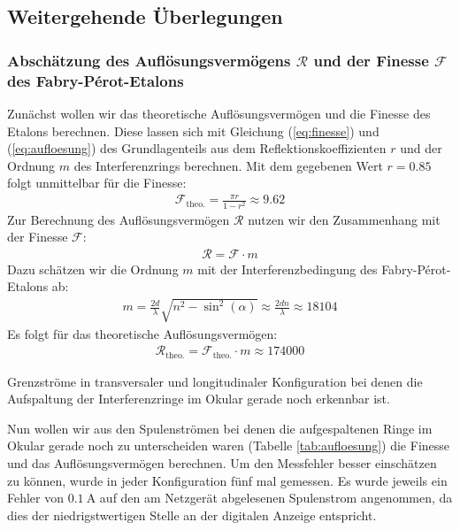 \documentclass[11pt, a4paper]{article}
\begin{document}
\subsection{Weitergehende Überlegungen}
\subsubsection{Abschätzung des Auflösungsvermögens $\mathcal{R}$ und der Finesse $\mathcal{F}$ des Fabry-Pérot-Etalons}
Zunächst wollen wir das theoretische Auflösungsvermögen und die Finesse des Etalons berechnen.
Diese lassen sich mit Gleichung (\ref{eq:finesse}) und (\ref{eq:aufloesung}) des Grundlagenteils aus dem Reflektionskoeffizienten $r$ und der Ordnung $m$ des Interferenzrings berechnen.
Mit dem gegebenen Wert $r = \num{0,85}$ folgt unmittelbar für die Finesse:
\begin{align*}
	\mathcal{F_\mathrm{theo.}} = \frac{\pi r}{1 - r^2} \approx \num{9.62}
\end{align*}
Zur Berechnung des Auflösungsvermögen $\mathcal{R}$ nutzen wir den Zusammenhang mit der Finesse $\mathcal{F}$:
\begin{align}
\mathcal{R} = \mathcal{F} \cdot m
\end{align}
Dazu schätzen wir die Ordnung $m$ mit der Interferenzbedingung des Fabry-Pérot-Etalons ab:
\begin{align*}
m = \frac{2 d}{\lambda} \sqrt{n^2 - \sin^2(\alpha)} \approx \frac{2 d n}{\lambda} \approx 18104
\end{align*}
Es folgt für das theoretische Auflösungsvermögen:
\begin{align*}
	\mathcal{R}_\mathrm{theo.} = \mathcal{F}_\mathrm{theo.} \cdot m  \approx \num{174000}
\end{align*}
\begin{table}[h]
	\centering
	
	\caption{Grenzströme in transversaler und longitudinaler Konfiguration bei denen die Aufspaltung der Interferenzringe im Okular gerade noch erkennbar ist.}
	\label{tab:aufloesung}
\end{table}
Nun wollen wir aus den Spulenströmen bei denen die aufgespaltenen Ringe im Okular gerade noch zu unterscheiden waren (Tabelle \ref{tab:aufloesung}) die Finesse und das Auflösungsvermögen berechnen.
Um den Messfehler besser einschätzen zu können, wurde in jeder Konfiguration fünf mal gemessen.
Es wurde jeweils ein Fehler von $\SI{0.1}{\ampere}$ auf den am Netzgerät abgelesenen Spulenstrom angenommen, da dies der niedrigstwertigen Stelle an der digitalen Anzeige entspricht.
\end{document}

